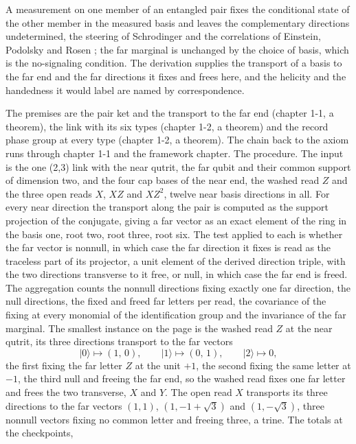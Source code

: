 \begin{chbridge}
A measurement on one member of an entangled pair fixes the conditional state of the other member in the measured basis and leaves the complementary directions undetermined, the steering of Schrodinger and the correlations of Einstein, Podolsky and Rosen \cite{Schrodinger1935,EPR1935}; the far marginal is unchanged by the choice of basis, which is the no-signaling condition. The derivation supplies the transport of a basis to the far end and the far directions it fixes and frees here, and the helicity and the handedness it would label are named by correspondence.
\end{chbridge}
\begin{chproof}
The premises are the pair ket and the transport to the far end (chapter 1-1, a theorem), the link with its six types (chapter 1-2, a theorem) and the record phase group at every type (chapter 1-2, a theorem). The chain back to the axiom runs through chapter 1-1 and the framework chapter. The procedure. The input is the one (2,3) link with the near qutrit, the far qubit and their common support of dimension two, and the four cap bases of the near end, the washed read $Z$ and the three open reads $X$, $XZ$ and $XZ^{2}$, twelve near basis directions in all. For every near direction the transport along the pair is computed as the support projection of the conjugate, giving a far vector as an exact element of the ring in the basis one, root two, root three, root six. The test applied to each is whether the far vector is nonnull, in which case the far direction it fixes is read as the traceless part of its projector, a unit element of the derived direction triple, with the two directions transverse to it free, or null, in which case the far end is freed. The aggregation counts the nonnull directions fixing exactly one far direction, the null directions, the fixed and freed far letters per read, the covariance of the fixing at every monomial of the identification group and the invariance of the far marginal. The smallest instance on the page is the washed read $Z$ at the near qutrit, its three directions transport to the far vectors
\begin{equation}
\lvert 0\rangle \mapsto (1,\,0),\qquad \lvert 1\rangle \mapsto (0,\,1),\qquad \lvert 2\rangle \mapsto 0 ,
\end{equation}
the first fixing the far letter $Z$ at the unit $+1$, the second fixing the same letter at $-1$, the third null and freeing the far end, so the washed read fixes one far letter and frees the two transverse, $X$ and $Y$. The open read $X$ transports its three directions to the far vectors $(1,1)$, $(1,-1+\sqrt{3})$ and $(1,-\sqrt{3})$, three nonnull vectors fixing no common letter and freeing three, a trine. The totals at the checkpoints,

\end{chproof}

